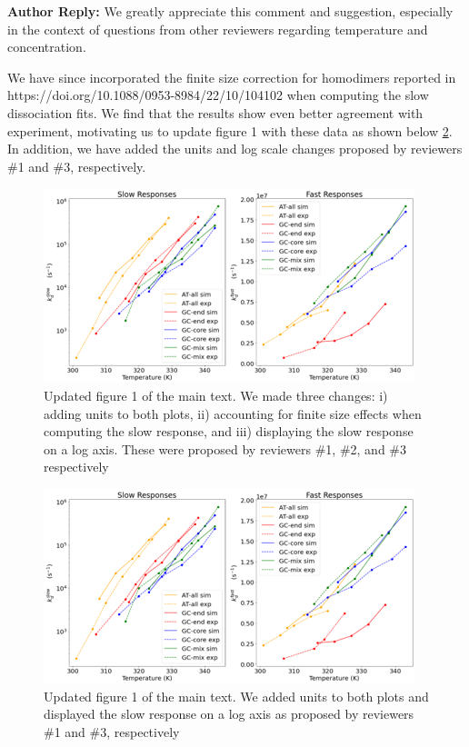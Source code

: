 \documentclass[11pt,a4paper]{letter} %
\begin{document}
\textbf{Author Reply:}   We greatly appreciate this comment and suggestion, especially in the context of questions from other reviewers regarding temperature and concentration. 

We have since incorporated the finite size correction for homodimers reported in  https://doi.org/10.1088/0953-8984/22/10/104102 \citep{Ouldridge2010ExtractingSimulations} when computing the slow dissociation fits. We find that the results show even better agreement with experiment, motivating us to update figure 1 with these data as shown below \ref{fig:conc_correction}. In addition, we have added the units and log scale changes proposed by reviewers \#1 and \#3, respectively.

\begin{figure}[ht!]
	\begin{center}
        \includegraphics[width=\textwidth]{cover_letter/revision_figures/both_response_log_4K_shift.png}
        \caption{Updated figure 1 of the main text. We made three changes: i) adding units to both plots, ii) accounting for finite size effects when computing the slow response, and iii) displaying the slow response on a log axis. These were proposed by reviewers \#1, \#2, and \#3 respectively}
        \label{fig:conc_correction}
	\end{center}
\end{figure}

\begin{figure}[ht!]
	\begin{center}
        \includegraphics[width=\textwidth]{cover_letter/revision_figures/both_response_log_4K_shift.png}
        \caption{Updated figure 1 of the main text. We added units to both plots and displayed the slow response on a log axis as proposed by reviewers \#1 and \#3, respectively}
        \label{fig:conc_correction}
	\end{center}
\end{figure}
\end{document}
